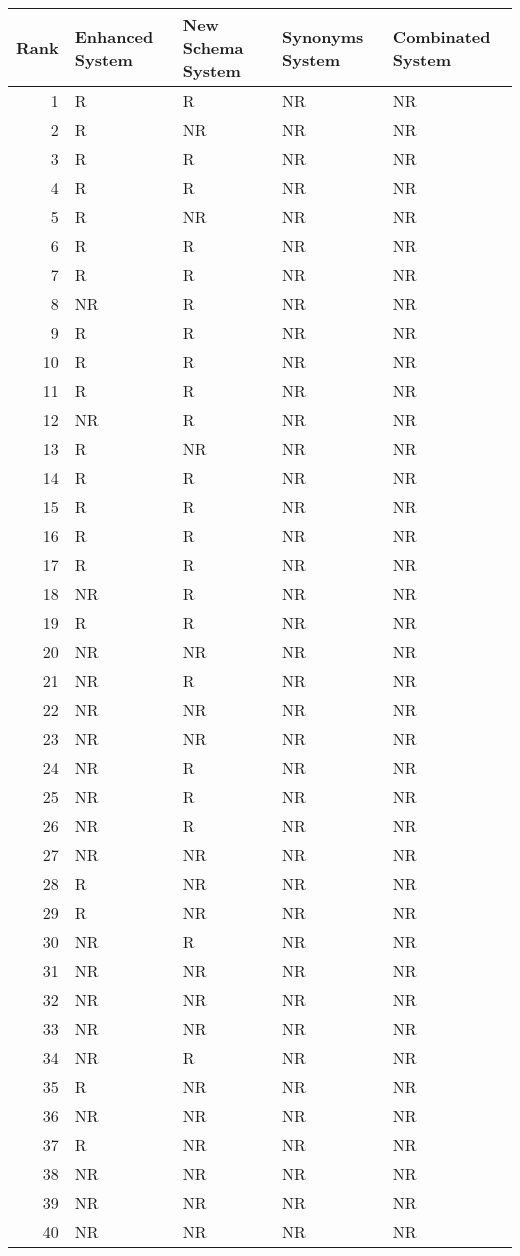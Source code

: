 \begin{tabular}{rllll}
\toprule
Rank & Enhanced System & New Schema System & Synonyms System & Combinated System \\
\midrule
1 & R & R & NR & NR \\
2 & R & NR & NR & NR \\
3 & R & R & NR & NR \\
4 & R & R & NR & NR \\
5 & R & NR & NR & NR \\
6 & R & R & NR & NR \\
7 & R & R & NR & NR \\
8 & NR & R & NR & NR \\
9 & R & R & NR & NR \\
10 & R & R & NR & NR \\
11 & R & R & NR & NR \\
12 & NR & R & NR & NR \\
13 & R & NR & NR & NR \\
14 & R & R & NR & NR \\
15 & R & R & NR & NR \\
16 & R & R & NR & NR \\
17 & R & R & NR & NR \\
18 & NR & R & NR & NR \\
19 & R & R & NR & NR \\
20 & NR & NR & NR & NR \\
21 & NR & R & NR & NR \\
22 & NR & NR & NR & NR \\
23 & NR & NR & NR & NR \\
24 & NR & R & NR & NR \\
25 & NR & R & NR & NR \\
26 & NR & R & NR & NR \\
27 & NR & NR & NR & NR \\
28 & R & NR & NR & NR \\
29 & R & NR & NR & NR \\
30 & NR & R & NR & NR \\
31 & NR & NR & NR & NR \\
32 & NR & NR & NR & NR \\
33 & NR & NR & NR & NR \\
34 & NR & R & NR & NR \\
35 & R & NR & NR & NR \\
36 & NR & NR & NR & NR \\
37 & R & NR & NR & NR \\
38 & NR & NR & NR & NR \\
39 & NR & NR & NR & NR \\
40 & NR & NR & NR & NR \\
\bottomrule
\end{tabular}
